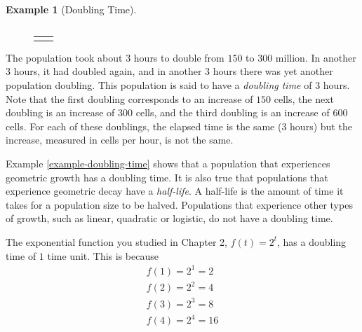 \documentclass[10pt,]{book}
\theoremstyle{plain}
\theoremstyle{definition}
\theoremstyle{definition}
\newtheorem{example}[theorem]{Example}
\theoremstyle{definition}
\numberwithin{equation}{section}
\newlength{\panelmax}
\begin{document}
\begin{example}[Doubling Time]
{{{{\begin{tabular}{ll}
\end{tabular}
}}}
\newlength{\phGtabular}\setlength{\phGtabular}{\ht\panelboxGtabular+\dp\panelboxGtabular}
\settototalheight{\phGtabular}{\usebox{\panelboxGtabular}}
\setlength{\panelmax}{\maxof{\panelmax}{\phGtabular}}
\leavevmode%
\setlength{\tabcolsep}{0\textwidth}
\begin{figure}
\begin{tabular}{@{}*{2}{c}@{}}
\begin{minipage}[c][\panelmax][t]{0.5\textwidth}\usebox{\panelboxFtabular}\end{minipage}&
\begin{minipage}[c][\panelmax][t]{0.5\textwidth}\usebox{\panelboxGtabular}\end{minipage}\end{tabular}
\end{figure}
}%
\par
The population took about \(3\) hours to double from \(150\) to \(300\) million.  In another \(3\) hours, it had doubled again, and in another \(3\) hours there was yet another population doubling. This population is said to have a \emph{doubling time} of \(3\) hours. Note that the first doubling corresponds to an increase of \(150\) cells, the next doubling is an increase of \(300\) cells, and the third doubling is an increase of \(600\) cells. For each of these doublings, the elapsed time is the same (\(3\) hours) but the increase, measured in cells per hour, is not the same.%
\end{example}
\par
Example \hyperref[example-doubling-time]{\ref{example-doubling-time}} shows that a population that experiences geometric growth has a doubling time. It is also true that populations that experience geometric decay have a \emph{half-life}. A half-life is the amount of time it takes for a population size to be halved. Populations that experience other types of growth, such as linear, quadratic or logistic, do not have a doubling time.%
\par
The exponential function you studied in Chapter 2, \(f(t)=2^t\), has a doubling time of \(1\) time unit. This is because%
%
\begin{gather*}
f(1)=2^1=2\\
f(2)=2^2=4\\
f(3)=2^3=8\\
f(4)=2^4=16
\end{gather*}
\end{document}
